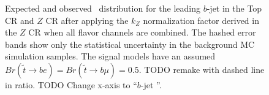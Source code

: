 \begin{figure}
  \centering
  \caption{
    Expected and observed \pt\ distribution for the leading $b$-jet in
    the Top CR and $Z$ CR after applying the $k_Z$ normalization factor derived
    in the $Z$ CR when all flavor channels are combined.
    The hashed error bands show only the statistical uncertainty in the
    background MC simulation samples.
    The signal models have an assumed
    $Br(\tilde{t}\rightarrow be) = Br(\tilde{t}\rightarrow b\mu) = 0.5$.
    {\color{red} TODO remake with dashed line in ratio.}
    {\color{red} TODO Change x-axis to ``$b$-jet \pt''.}
  }
  \label{fig:cr_b_jet_pt_0__w_norm_factor}
\end{figure}

